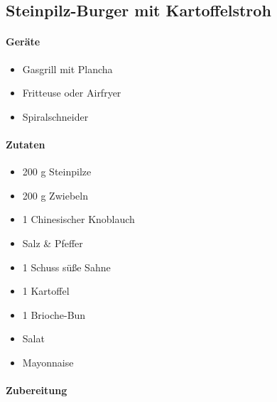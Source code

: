 \subsection{Steinpilz-Burger mit Kartoffelstroh}

\paragraph{Geräte}

\begin{itemize}[noitemsep]
	\item Gasgrill mit Plancha
	\item Fritteuse oder Airfryer
	\item Spiralschneider
\end{itemize}

\paragraph{Zutaten}

\begin{itemize}[noitemsep]
	\item 200 g Steinpilze
	\item 200 g Zwiebeln
	\item 1 Chinesischer Knoblauch
	\item Salz \& Pfeffer
	\item 1 Schuss süße Sahne
	\item 1 Kartoffel
	\item 1 Brioche-Bun
	\item Salat
	\item Mayonnaise
\end{itemize}

\paragraph{Zubereitung}



